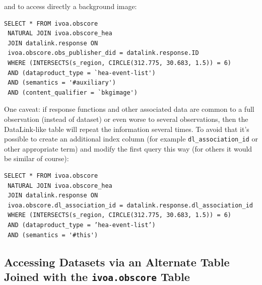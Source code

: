 \noindent and to  access directly a background image:

{\small
\begin{verbatim}
SELECT * FROM ivoa.obscore
 NATURAL JOIN ivoa.obscore_hea
 JOIN datalink.response ON 
 ivoa.obscore.obs_publisher_did = datalink.response.ID
 WHERE (INTERSECTS(s_region, CIRCLE(312.775, 30.683, 1.5)) = 6)
 AND (dataproduct_type = `hea-event-list')
 AND (semantics = '#auxiliary')
 AND (content_qualifier = `bkgimage')
\end{verbatim}
}

One caveat: if response functions and other associated data are common to a full observation (instead of dataset) or even worse to several observations, then the DataLink-like table will repeat the information several times. To avoid that it's possible to create an additional index column (for example  {\tt dl\_association\_id} or other appropriate term) and modify the first query this way (for others it would be similar of course):

{\small
\begin{verbatim}
SELECT * FROM ivoa.obscore
 NATURAL JOIN ivoa.obscore_hea
 JOIN datalink.response ON
 ivoa.obscore.dl_association_id = datalink.response.dl_association_id
 WHERE (INTERSECTS(s_region, CIRCLE(312.775, 30.683, 1.5)) = 6)
 AND (dataproduct_type = ’hea-event-list’)
 AND (semantics = '#this')
\end{verbatim}
}

\subsection{Accessing Datasets via an Alternate Table Joined with the {\tt ivoa.obscore} Table}\label{sec:respaccess}



